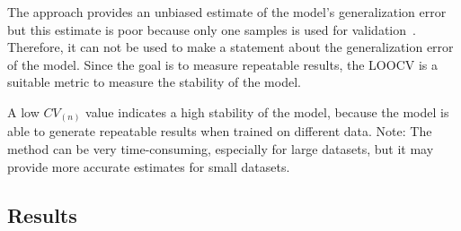 The approach provides an unbiased estimate of the model's generalization error
but this estimate is poor because only one samples is used for validation~\cite[p.
201]{gareth2013introduction}.
Therefore, it can not be used to make a statement about the generalization error of the model.
Since the goal is to measure repeatable results, the \ac{LOOCV} is a suitable metric to measure
the stability of the model.

%

A low $CV_{(n)}$ value indicates a high stability of the model, because the model is able to
generate repeatable results when trained on different data.
Note: The method can be very time-consuming, especially for large datasets, but it may provide
more accurate estimates for small datasets.




\subsection{Results}\label{subsec:results-stability}

